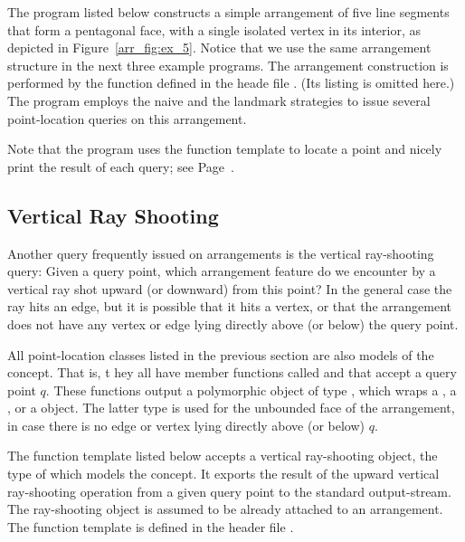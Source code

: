 The program listed below constructs a simple arrangement of five line
segments that form a pentagonal face, with a single isolated
vertex in its interior, as depicted in Figure~\ref{arr_fig:ex_5}.
Notice that we use the same arrangement structure in the next
three example programs. The arrangement construction is performed by
the function  defined in the heade file
. (Its listing is omitted here.) The
program employs the naive and the landmark strategies to issue
several point-location queries on this arrangement.


Note that the program uses the  function template
to locate a point and nicely print the result of each query; see
Page~\pageref{lst:pl}.

\subsection{Vertical Ray Shooting\label{arr_ssec:ray_shoot}}
Another query frequently issued on arrangements is the vertical
ray-shooting query: Given a query point, which arrangement feature
do we encounter by a vertical ray shot upward (or downward) from this
point? In the general case the ray hits an edge, but it is possible
that it hits a vertex, or that the arrangement does not have any
vertex or edge lying directly above (or below) the query point.

All point-location classes listed in the previous section are also
models of the  concept. That is, t
hey all have member functions called  and
 that accept a query point $q$. These functions
output a polymorphic object of type , which wraps a
, a , or a
 object. The latter type is used for the
unbounded face of the arrangement, in case there is no edge or
vertex lying directly above (or below) $q$.

The function template  listed
below accepts a vertical ray-shooting object, the type of which
models the  concept. It exports
the result of the upward vertical ray-shooting operation from a
given query point to the standard output-stream. The ray-shooting
object  is assumed to be already attached to an arrangement.
The function template is defined in the header file
.

